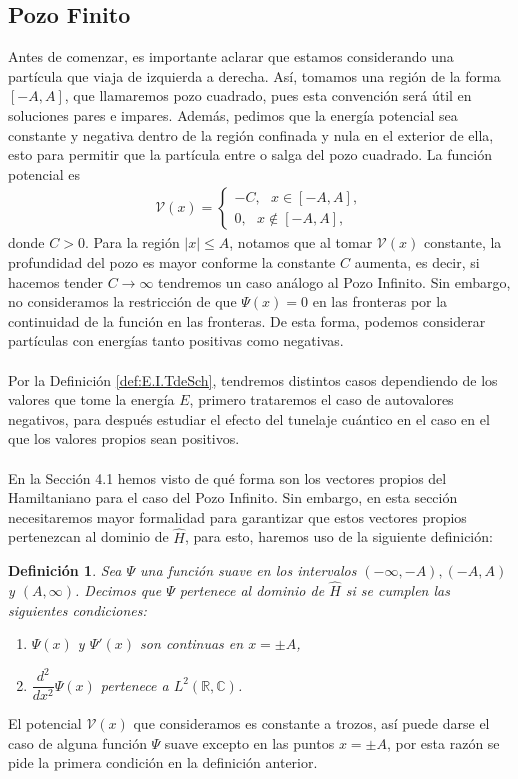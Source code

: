 \documentclass[12pt]{article}
\newtheorem{defn}[teo]{Definición}
\theoremstyle{definition}
\newcommand*{\field}[1]{\mathbb{#1}}
\begin{document}
\subsection{Pozo Finito}
\noindent
Antes de comenzar, es importante aclarar que estamos considerando una partícula que viaja de izquierda a derecha. Así, tomamos una región de la forma $[-A,A]$, que llamaremos pozo cuadrado, pues esta convención será útil en soluciones pares e impares. Además, pedimos que la energía potencial sea constante y negativa dentro de la región confinada y nula en el exterior de ella, esto para permitir que la partícula entre o salga del pozo cuadrado. La función potencial es
\begin{align}
        \mathcal{V}(x) = 
        \left\{ \begin{array}{ll}
        -C, \:\:\:  x \in [-A,A],
        \\
        0, \:\:\: x \notin [-A,A],
        \end{array}
        \right.
        \label{eq:PotencialFinito}
\end{align}
donde $C>0$. Para la región $|x|\leq A$, notamos que al tomar $\mathcal{V}(x)$ constante, la profundidad del pozo es mayor conforme la constante $C$ aumenta, es decir, si hacemos tender $C \rightarrow \infty$ tendremos un caso análogo al Pozo Infinito. Sin embargo, no consideramos la restricción de que $\Psi(x) = 0$ en las fronteras por la continuidad de la función en las fronteras. De esta forma, podemos considerar partículas con energías tanto positivas como negativas. 
\\ \\
Por la Definición \ref{def:E.I.TdeSch}, tendremos distintos casos dependiendo de los valores que tome la energía $E$, primero trataremos el caso de autovalores negativos, para después estudiar el efecto del tunelaje cuántico en el caso en el que los valores propios sean positivos.
\\ \\
En la Sección 4.1 hemos visto de qué forma son los vectores propios del Hamiltaniano para el caso del Pozo Infinito. Sin embargo, en esta sección necesitaremos mayor formalidad para garantizar que estos vectores propios pertenezcan al dominio de $\hat{H}$, para esto, haremos uso de la siguiente definición:
\begin{defn}
    Sea $\Psi$ una función suave en los intervalos $(-\infty,-A), (-A,A)$ y $(A,\infty)$. Decimos que $\Psi$ pertenece al dominio de $\hat{H}$ si se cumplen las siguientes condiciones:
    \begin{enumerate}[1.]
    \item  $\Psi(x)$ y $\Psi'(x)$ son continuas en $x=\pm A$,
    \item 
    $\dfrac{d^2}{dx^2}\Psi(x)$ pertenece a $L^{2}(\field{R},\field{C})$.
    \end{enumerate}
    \label{def:Pertenencia1}
\end{defn}
\noindent
El potencial $\mathcal{V}(x)$ que consideramos es constante a trozos, así puede darse el caso de alguna función $\Psi$ suave excepto en las puntos $x=\pm A$, por esta razón se pide la primera condición en la definición anterior.
\end{document}
